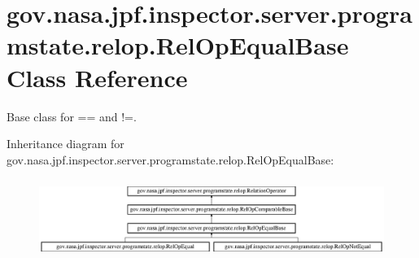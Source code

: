 \hypertarget{classgov_1_1nasa_1_1jpf_1_1inspector_1_1server_1_1programstate_1_1relop_1_1_rel_op_equal_base}{}\section{gov.\+nasa.\+jpf.\+inspector.\+server.\+programstate.\+relop.\+Rel\+Op\+Equal\+Base Class Reference}
\label{classgov_1_1nasa_1_1jpf_1_1inspector_1_1server_1_1programstate_1_1relop_1_1_rel_op_equal_base}


Base class for == and !=.  


Inheritance diagram for gov.\+nasa.\+jpf.\+inspector.\+server.\+programstate.\+relop.\+Rel\+Op\+Equal\+Base\+:\begin{figure}[H]
\begin{center}
\leavevmode
\includegraphics[height=2.592592cm]{classgov_1_1nasa_1_1jpf_1_1inspector_1_1server_1_1programstate_1_1relop_1_1_rel_op_equal_base}
\end{center}
\end{figure}
